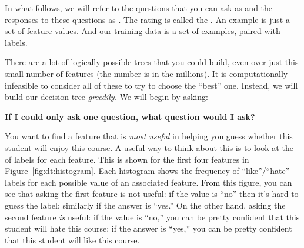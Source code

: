 In what follows, we will refer to the questions that you can ask as
 and the responses to these questions as
.  The rating is called the .
An example is just a set of feature values.  And our training data is
a set of examples, paired with labels.

There are a lot of logically possible trees that you could build, even
over just this small number of features (the number is in the
millions).  It is computationally infeasible to consider all of these
to try to choose the ``best'' one.  Instead, we will build our
decision tree \emph{greedily.}  We will begin by asking:

{\bf If I could only ask one question, what question would I ask?}


\MoveNextFigure{-10cm}

You want to find a feature that is \emph{most useful} in helping you
guess whether this student will enjoy this course.
A useful way to think about this is to look at the 
of labels for each feature.  This is shown for the first four features
in Figure~\ref{fig:dt:histogram}.  Each histogram shows the frequency
of ``like''/``hate'' labels for each possible value of an associated
feature.  From this figure, you can see that asking the first feature
is not useful: if the value is ``no'' then it's hard to guess the
label; similarly if the answer is ``yes.''  On the other hand, asking
the second feature \emph{is} useful: if the value is ``no,'' you can
be pretty confident that this student will hate this course; if the
answer is ``yes,'' you can be pretty confident that this student will
like this course.

